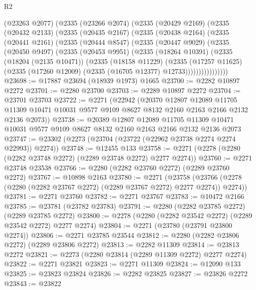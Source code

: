 \begin{lexlean}{R2}
\begin{coremodule}
    (@23263 @2077)
    (@2335
      (@23266 @2074)
      (@2335
        (@20429 @2169)
        (@2335
          (@20432 @2133)
          (@2335
            (@20435 @2167)
            (@2335
              (@20438 @2164)
              (@2335
                (@20441 @2161)
                (@2335
                  (@20444 @8547)
                  (@2335
                    (@20447 @9029)
                    (@2335
                      (@20450 @9497)
                      (@2335
                        (@20453 @9951)
                        (@2335
                          (@18264 @10391)
                          (@2335
                            (@18204 (@2135 @10471))
                            (@2335
                              (@18158 @11229)
                              (@2335
                                (@17257 @11625)
                                (@2335 (@17260 @12009) (@2335 (@16705 @12377) @12733))))))))))))))))
@23698 := @17887 @23694 (@18939 @1973) @1665
@23700 := @2282 @10897 @2272
@23701 := @2280 @23700
@23703 := @2289 @10897 @2272
@23704 := @23701 @23703
@23722 := @2271
    (@22942
      (@20370
        @12807
        @12089
        @11705
        @11309
        @10471
        @10031
        @9577
        @9109
        @8627
        @8132
        @2160
        @2163
        @2166
        @2132
        @2136
        @2073))
@23738 := @20389
    @12807
    @12089
    @11705
    @11309
    @10471
    @10031
    @9577
    @9109
    @8627
    @8132
    @2160
    @2163
    @2166
    @2132
    @2136
    @2073
@23747 := @23302 (@2273 (@23704 (@23722 (@22962 @23738 @2274 @2274 @22993)) @2274))
@23748 := @12455 @133
@23758 := @2271 (@2278 (@2280 (@2282 @23748 @2272) (@2289 @23748 @2272) @2277 @2274))
@23760 := @2271 @23748 @23538
@23766 := @2280 (@2282 @23760 @2272) (@2289 @23760 @2272)
@23767 := @10898 @2163
@23780 := @2271
    (@23758 (@23766 (@2278 (@2280 (@2282 @23767 @2272) (@2289 @23767 @2272) @2277 @2274)) @2274))
@23781 := @2271 @23760
@23782 := @2271 @23767
@23783 := @10472 @2166
@23785 := @23781 (@23782 @23783)
@23791 := @2280 (@2282 @23785 @2272) (@2289 @23785 @2272)
@23800 := @2278 (@2280 (@2282 @23542 @2272) (@2289 @23542 @2272) @2277 @2274)
@23804 := @2271 (@23780 (@23791 @23800 @2274))
@23806 := @2271 @23785 @23544
@23812 := @2280 (@2282 @23806 @2272) (@2289 @23806 @2272)
@23813 := @2282 @11309
@23814 := @23813 @2272
@23821 := @2273 (@2280 @23814 (@2289 @11309 @2272) @2277 @2274)
@23822 := @2271 @23821
@23823 := @2271 @11309
@23824 := @12090 @133
@23825 := @23823 @23824
@23826 := @2282 @23825
@23827 := @23826 @2272
@23843 := @23822

\end{coremodule}
\end{lexlean}
